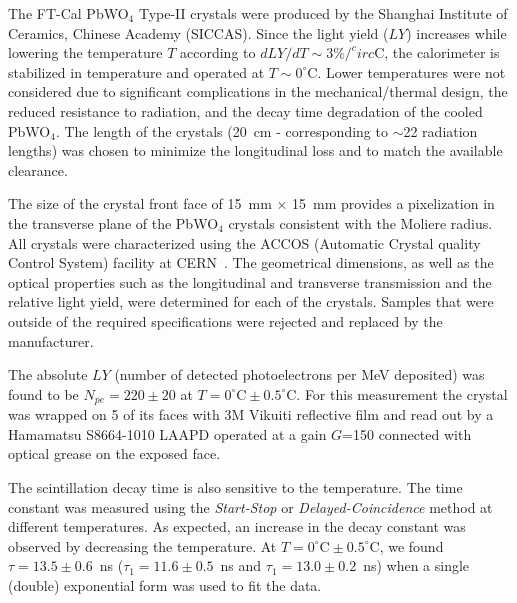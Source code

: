 The FT-Cal PbWO$_4$ Type-II crystals were produced by the Shanghai Institute of Ceramics, Chinese Academy
(SICCAS). Since the light yield ($LY$) increases while lowering the temperature $T$ according to
$dLY/dT \sim 3\%/^circ\textrm{C}$, the calorimeter is stabilized in temperature and operated at
$T \sim 0^\circ\textrm{C}$. Lower temperatures were not considered due to significant complications in the
mechanical/thermal design, the reduced resistance to radiation,  and the decay time degradation of the cooled
PbWO$_4$. The length of the crystals (20~cm - corresponding to $\sim$22 radiation lengths) was chosen to
minimize the longitudinal loss and to match the available clearance.

The size of the crystal front face of 15~mm $\times$ 15~mm provides a pixelization in the transverse plane of
the PbWO$_4$ crystals consistent with the Moliere radius. All crystals were characterized using the ACCOS
(Automatic Crystal quality Control System) facility at CERN~\cite{accos}. The geometrical dimensions, as well as the
optical properties such as the longitudinal and transverse transmission and the relative light yield, were determined
for each of the crystals. Samples that were outside of the required specifications were rejected and replaced by the
manufacturer. 

The absolute $LY$ (number of detected photoelectrons per MeV deposited) was found to be $N_{pe}=220\pm 20$
at $T=0^\circ\textrm{C}\pm 0.5^\circ\textrm{C}$. For this measurement the crystal was wrapped on 5 of its faces
with 3M Vikuiti reflective film and read out by a Hamamatsu S8664-1010 LAAPD operated at a gain $G$=150
connected with optical grease on the exposed face. 

The scintillation decay time is also sensitive to the temperature. The time constant was measured using the
{\it Start-Stop} or {\it Delayed-Coincidence} method at different temperatures. As expected, an increase in the
decay constant was observed by decreasing the temperature. At $T=0^\circ\textrm{C}\pm 0.5^\circ\textrm{C}$, we
found $\tau=13.5\pm 0.6$~ns ($\tau_1=11.6\pm 0.5$~ns and $\tau_1=13.0\pm 0.2$~ns) when a single (double)
exponential form was used to fit the data.

